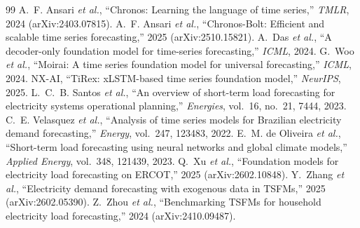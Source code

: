 \documentclass[conference]{IEEEtran}
\begin{document}
\begin{thebibliography}{99}
 A.~F. Ansari \emph{et al.}, ``Chronos: Learning the language of time series,'' \emph{TMLR}, 2024 (arXiv:2403.07815).
 A.~F. Ansari \emph{et al.}, ``Chronos-Bolt: Efficient and scalable time series forecasting,'' 2025 (arXiv:2510.15821).
 A.~Das \emph{et al.}, ``A decoder-only foundation model for time-series forecasting,'' \emph{ICML}, 2024.
 G.~Woo \emph{et al.}, ``Moirai: A time series foundation model for universal forecasting,'' \emph{ICML}, 2024.
 NX-AI, ``TiRex: xLSTM-based time series foundation model,'' \emph{NeurIPS}, 2025.
 L.~C.~B. Santos \emph{et al.}, ``An overview of short-term load forecasting for electricity systems operational planning,'' \emph{Energies}, vol.~16, no.~21, 7444, 2023.
 C.~E. Velasquez \emph{et al.}, ``Analysis of time series models for Brazilian electricity demand forecasting,'' \emph{Energy}, vol.~247, 123483, 2022.
 E.~M. de Oliveira \emph{et al.}, ``Short-term load forecasting using neural networks and global climate models,'' \emph{Applied Energy}, vol.~348, 121439, 2023.
 Q.~Xu \emph{et al.}, ``Foundation models for electricity load forecasting on ERCOT,'' 2025 (arXiv:2602.10848).
 Y.~Zhang \emph{et al.}, ``Electricity demand forecasting with exogenous data in TSFMs,'' 2025 (arXiv:2602.05390).
 Z.~Zhou \emph{et al.}, ``Benchmarking TSFMs for household electricity load forecasting,'' 2024 (arXiv:2410.09487).
\end{thebibliography}
\end{document}
